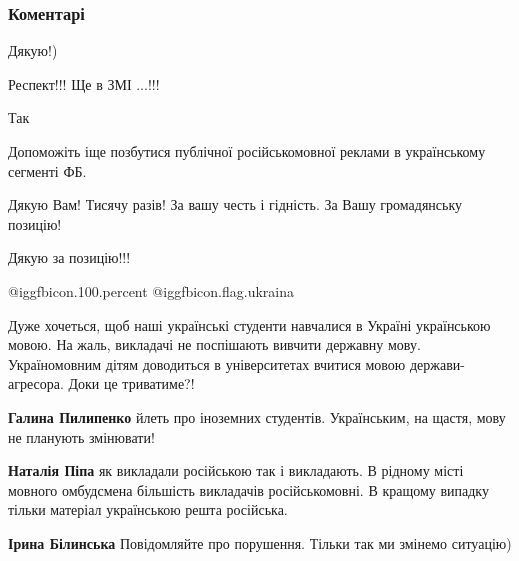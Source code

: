  
 
 
 
 
\subsubsection{Коментарі}
\label{sec:23_11_2021.fb.pipa_natalia.ukraina.1.jazyk_vuzy.cmt}

\begin{itemize} %
Дякую!)

Респект!!! Ще в ЗМІ ...!!!


Так


Допоможіть іще позбутися публічної російськомовної реклами в українському сегменті ФБ.


Дякую Вам! Тисячу разів! За вашу честь і гідність. За Вашу громадянську
позицію!

Дякую за позицію!!!

 @igg{fbicon.100.percent}   @igg{fbicon.flag.ukraina}


Дуже хочеться, щоб наші українські студенти навчалися в Україні українською
мовою. На жаль, викладачі не поспішають вивчити державну мову. Україномовним
дітям доводиться в університетах вчитися мовою держави-агресора. Доки це
триватиме?!

\begin{itemize} %
\textbf{Галина Пилипенко} йлеть про іноземних студентів. Українським, на щастя, мову не планують змінювати!

\begin{itemize} %
\textbf{Наталія Піпа} як викладали російською так і викладають. В рідному місті мовного омбудсмена більшість викладачів російськомовні. В кращому випадку тільки матеріал українською решта російська.

\textbf{Ірина Білинська} Повідомляйте про порушення.
Тільки так ми змінемо ситуацію)


\end{itemize}
\end{itemize}
\end{itemize}

